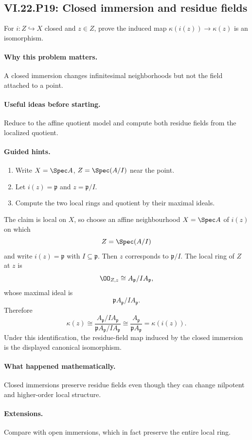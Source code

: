\subsection*{VI.22.P19: Closed immersion and residue fields}
\begin{problem}\label{prob:vi22-p19}
For $i:Z\hookrightarrow X$ closed and $z\in Z$, prove the induced map $\kappa(i(z))\to\kappa(z)$ is an isomorphism.
\end{problem}

\ifdefined\FullProblemDossiers
\paragraph{Why this problem matters.}
A closed immersion changes infinitesimal neighborhoods but not the field attached to a point.

\paragraph{Useful ideas before starting.}
Reduce to the affine quotient model and compute both residue fields from the localized quotient.

\paragraph{Guided hints.}
\begin{enumerate}
\item Write $X=\Spec A$, $Z=\Spec(A/I)$ near the point.
\item Let $i(z)=\mathfrak p$ and $z=\mathfrak p/I$.
\item Compute the two local rings and quotient by their maximal ideals.
\end{enumerate}

\begin{solution}
The claim is local on $X$, so choose an affine neighbourhood
$X=\Spec A$ of $i(z)$ on which
\[
 Z=\Spec(A/I)
\]
and write $i(z)=\mathfrak p$ with $I\subseteq\mathfrak p$.  Then
$z$ corresponds to $\mathfrak p/I$.  The local ring of $Z$ at $z$ is
\[
 \OO_{Z,z}\cong A_{\mathfrak p}/IA_{\mathfrak p},
\]
whose maximal ideal is
\[
 \mathfrak pA_{\mathfrak p}/IA_{\mathfrak p}.
\]
Therefore
\[
 \kappa(z)
 \cong
 \frac{A_{\mathfrak p}/IA_{\mathfrak p}}
      {\mathfrak pA_{\mathfrak p}/IA_{\mathfrak p}}
 \cong
 \frac{A_{\mathfrak p}}{\mathfrak pA_{\mathfrak p}}
 =\kappa(i(z)).
\]
Under this identification, the residue-field map induced by the closed immersion is the
displayed canonical isomorphism.
\end{solution}

\paragraph{What happened mathematically.}
Closed immersions preserve residue fields even though they can change nilpotent and higher-order local structure.

\paragraph{Extensions.}
Compare with open immersions, which in fact preserve the entire local ring.
\fi

